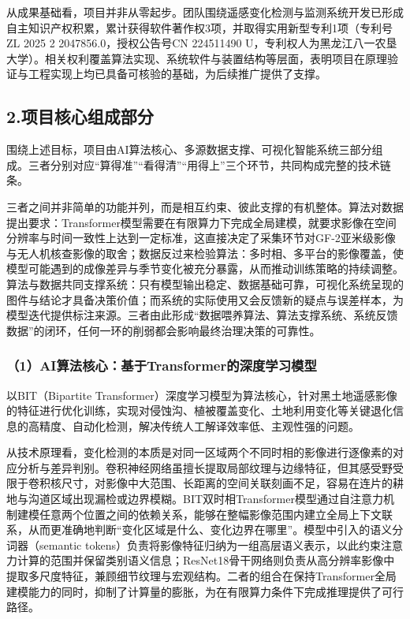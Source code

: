 \documentclass[12pt, a4paper]{ctexart}
\begin{document}
从成果基础看，项目并非从零起步。团队围绕遥感变化检测与监测系统开发已形成自主知识产权积累，累计获得软件著作权3项，并取得实用新型专利1项（专利号ZL 2025 2 2047856.0，授权公告号CN 224511490 U，专利权人为黑龙江八一农垦大学）。相关权利覆盖算法实现、系统软件与装置结构等层面，表明项目在原理验证与工程实现上均已具备可核验的基础，为后续推广提供了支撑。

\subsection{2.项目核心组成部分}

围绕上述目标，项目由AI算法核心、多源数据支撑、可视化智能系统三部分组成。三者分别对应“算得准”“看得清”“用得上”三个环节，共同构成完整的技术链条。

三者之间并非简单的功能并列，而是相互约束、彼此支撑的有机整体。算法对数据提出要求：Transformer模型需要在有限算力下完成全局建模，就要求影像在空间分辨率与时间一致性上达到一定标准，这直接决定了采集环节对GF-2亚米级影像与无人机核查影像的取舍；数据反过来检验算法：多时相、多平台的影像覆盖，使模型可能遇到的成像差异与季节变化被充分暴露，从而推动训练策略的持续调整。算法与数据共同支撑系统：只有模型输出稳定、数据基础可靠，可视化系统呈现的图件与结论才具备决策价值；而系统的实际使用又会反馈新的疑点与误差样本，为模型迭代提供标注来源。三者由此形成“数据喂养算法、算法支撑系统、系统反馈数据”的闭环，任何一环的削弱都会影响最终治理决策的可靠性。

\subsubsection{（1）AI算法核心：基于Transformer的深度学习模型}

以BIT（Bipartite Transformer）深度学习模型为算法核心，针对黑土地遥感影像的特征进行优化训练，实现对侵蚀沟、植被覆盖变化、土地利用变化等关键退化信息的高精度、自动化检测，解决传统人工解译效率低、主观性强的问题。

从技术原理看，变化检测的本质是对同一区域两个不同时相的影像进行逐像素的对应分析与差异判别。卷积神经网络虽擅长提取局部纹理与边缘特征，但其感受野受限于卷积核尺寸，对影像中大范围、长距离的空间关联刻画不足，容易在连片的耕地与沟道区域出现漏检或边界模糊。BIT双时相Transformer模型\cite{ref1}通过自注意力机制建模任意两个位置之间的依赖关系，能够在整幅影像范围内建立全局上下文联系，从而更准确地判断“变化区域是什么、变化边界在哪里”。模型中引入的语义分词器（semantic tokens）负责将影像特征归纳为一组高层语义表示，以此约束注意力计算的范围并保留类别语义信息；ResNet18骨干网络则负责从高分辨率影像中提取多尺度特征，兼顾细节纹理与宏观结构。二者的组合在保持Transformer全局建模能力的同时，抑制了计算量的膨胀，为在有限算力条件下完成推理提供了可行路径。
\end{document}
